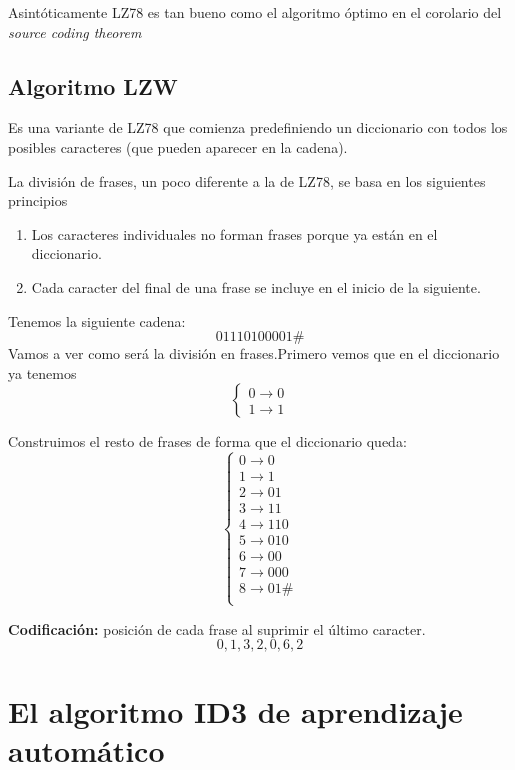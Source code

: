 \obs Asintóticamente LZ78 es tan bueno como el algoritmo óptimo en el corolario del \textit{source coding theorem}

\subsection{Algoritmo LZW}

Es una variante de LZ78 que comienza predefiniendo un diccionario con todos los posibles caracteres (que pueden aparecer en la cadena).

La división de frases, un poco diferente a la de LZ78, se basa en los siguientes principios
\begin{enumerate}
	\item Los caracteres individuales no forman frases porque ya están en el diccionario.
	\item Cada caracter del final de una frase se incluye en el inicio de la siguiente.
\end{enumerate}

\begin{example}
	Tenemos la siguiente cadena:
	$$01110100001\#$$
	Vamos a ver como será la división en frases.Primero vemos que en el diccionario ya tenemos
	$$\begin{cases}
	0 \rightarrow 0\\
	1 \rightarrow 1
	\end{cases}$$

	Construimos el resto de frases de forma que el diccionario queda:
		$$\begin{cases}
		0 \rightarrow 0\\
		1 \rightarrow 1\\
		2 \rightarrow 01\\
		3 \rightarrow 11\\
		4 \rightarrow 110\\
		5 \rightarrow 010\\
		6 \rightarrow 00\\
		7 \rightarrow 000\\
		8 \rightarrow 01\#\\
		\end{cases}$$

	\textbf{Codificación:} posición de cada frase al suprimir el último caracter.
	$$0,1,3,2,0,6,2$$
\end{example}

\section{El algoritmo ID3 de aprendizaje automático}

